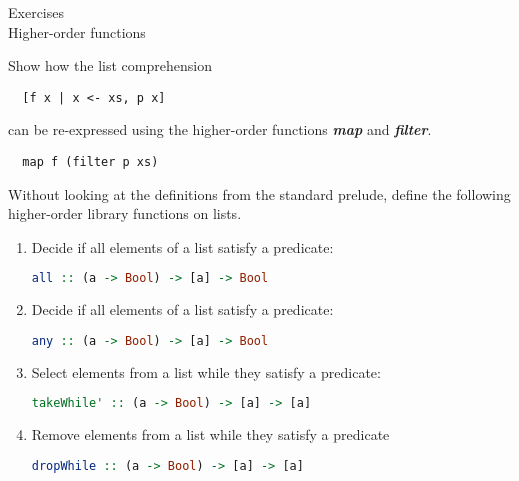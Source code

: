\documentclass{article}
\newcommand\ExTitle{Higher-order functions}
\newcommand\fullExTitle{Exercises \\ \ExTitle }
\begin{document}
\begin{Huge}
	\begin{center}
	\fullExTitle
	\end{center}
\end{Huge}

\begin{Exercise}

Show how the list comprehension \\
\begin{lstlisting}
  [f x | x <- xs, p x] 
\end{lstlisting}
can be re-expressed using the higher-order functions \textbf{\textit{map}} and \textbf{\textit{filter}}.
\end{Exercise}
\begin{Answer}
\begin{lstlisting}
  map f (filter p xs) 
\end{lstlisting}
\end{Answer}
\begin{Exercise} [difficulty=3]
Without looking at the definitions from the standard prelude, define the following higher-order library functions on lists.
\begin{enumerate}
	\item Decide if all elements of a list satisfy a predicate:
\begin{lstlisting}[language=Haskell]
all :: (a -> Bool) -> [a] -> Bool
\end{lstlisting}
	\item Decide if all elements of a list satisfy a predicate:
\begin{lstlisting}[language=Haskell]
any :: (a -> Bool) -> [a] -> Bool
\end{lstlisting}
	\item Select elements from a list while they satisfy a predicate:
\begin{lstlisting}[language=Haskell]
  takeWhile' :: (a -> Bool) -> [a] -> [a]
\end{lstlisting}
	\item Remove elements from a list while they satisfy a predicate
\begin{lstlisting}[language=Haskell]
dropWhile :: (a -> Bool) -> [a] -> [a]
\end{lstlisting}
\end{enumerate}
\end{Exercise}
\end{document}
